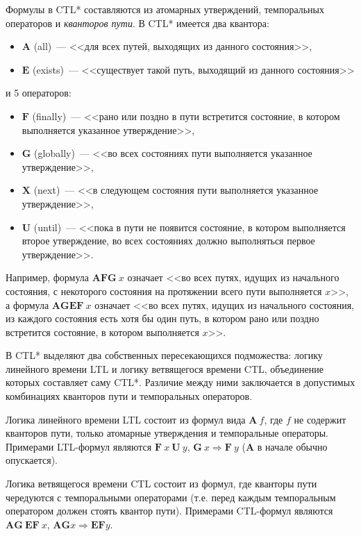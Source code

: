 \documentclass[a4paper,notitlepage,14pt]{article}
\begin{document}
Формулы в CTL* составляются из атомарных утверждений, темпоральных операторов и
\emph{кванторов пути}. В CTL* имеется два квантора:

\begin{itemize}
\item $\mathbf{A}$ (all)~--- <<для всех путей, выходящих из данного состояния>>,
\item $\mathbf{E}$ (exists)~--- <<существует такой путь, выходящий из данного состояния>>
\end{itemize}

\noindent и 5 операторов:

\begin{itemize}
\item $\mathbf{F}$ (finally)~--- <<рано или поздно в пути встретится состояние, в котором
  выполняется указанное утверждение>>,
\item $\mathbf{G}$ (globally)~--- <<во всех состояниях пути выполняется указанное
  утверждение>>,
\item $\mathbf{X}$ (next)~--- <<в следующем состояния пути выполняется указанное
  утверждение>>,
\item $\mathbf{U}$ (until)~--- <<пока в пути не появится состояние, в котором выполняется
  второе утверждение, во всех состояниях должно выполняться первое утверждение>>.
\end{itemize}

Например, формула $\mathbf{AFG}~ x$ означает <<во всех путях, идущих из начального
состояния, с некоторого состояния на протяжении всего пути выполняется $x$>>, а формула
$\mathbf{AGEF}~ x$ означает <<во всех путях, идущих из начального состояния, из каждого
состояния есть хотя бы один путь, в котором рано или поздно встретится состояние, в
котором выполняется $x$>>.

В CTL* выделяют два собственных пересекающихся подможества: логику линейного времени LTL и
логику ветвящегося времени CTL, объединение которых составляет саму CTL*. Различие между
ними заключается в допустимых комбинациях кванторов пути и темпоральных операторов. 

Логика линейного времени LTL состоит из формул вида $\mathbf{A}~f$, где $f$ не содержит
кванторов пути, только атомарные утверждения и темпоральные операторы. Примерами
LTL-формул являются $\mathbf{F}~x~\mathbf{U}~y$, $\mathbf{G}~x \Rightarrow \mathbf{F}~y$
($\mathbf{A}$ в начале обычно опускается).

Логика ветвящегося времени CTL состоит из формул, где кванторы пути чередуются с
темпоральными операторами (т.е. перед каждым темпоральным оператором должен стоять квантор
пути). Примерами CTL-формул являются $\mathbf{AG}~\mathbf{EF}~x$, $\mathbf{AG} x
\Rightarrow \mathbf{EF} y$.
\end{document}
